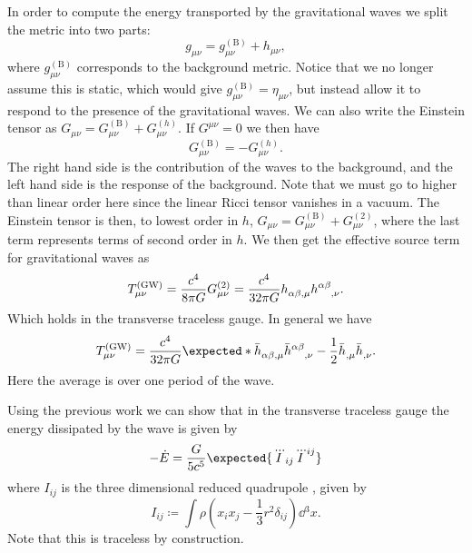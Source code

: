 \documentclass[fleqn]{NotesClass}
\begin{document}
    In order to compute the energy transported by the gravitational waves we split the metric into two parts:
    \begin{equation}
        g_{\mu\nu} = g_{\mu\nu}^{\mathrm{(B)}} + h_{\mu\nu},
    \end{equation}
    where \(g_{\mu\nu}^{\mathrm{(B)}}\) corresponds to the background metric.
    Notice that we no longer assume this is static, which would give \(g_{\mu\nu}^{\mathrm{(B)}} = \eta_{\mu\nu}\), but instead allow it to respond to the presence of the gravitational waves.
    We can also write the Einstein tensor as \(G_{\mu\nu} = G_{\mu\nu}^{\mathrm{(B)}} + G_{\mu\nu}^{(h)}\).
    If \(G^{\mu\nu} = 0\) we then have
    \begin{equation}
        G_{\mu\nu}^{\mathrm{(B)}} = -G_{\mu\nu}^{(h)}.
    \end{equation}
    The right hand side is the contribution of the waves to the background, and the left hand side is the response of the background.
    Note that we must go to higher than linear order here since the linear Ricci tensor vanishes in a vacuum.
    The Einstein tensor is then, to lowest order in \(h\), \(G_{\mu\nu} = G_{\mu\nu}^{\mathrm{(B)}} + G_{\mu\nu}^{(2)}\), where the last term represents terms of second order in \(h\).
    We then get the effective source term for gravitational waves as
    \begin{equation}
        T_{\mu\nu}^{\mathrm{(GW)}} = \frac{c^4}{8\pi G}G_{\mu\nu}^{(2)} = \frac{c^4}{32\pi G}\tensor{h}{_{\alpha\beta,\mu}}\tensor{h}{^{\alpha\beta}_{,\nu}}.
    \end{equation}
    Which holds in the transverse traceless gauge.
    In general we have
    \begin{equation}
        T_{\mu\nu}^{\mathrm{(GW)}} = \frac{c^4}{32\pi G}\expected*{\tensor{\bar{h}}{_{\alpha\beta,\mu}}\tensor{\bar{h}}{^{\alpha\beta}_{,\nu}} - \frac{1}{2}\tensor{\bar{h}}{_{,\mu}} \tensor{\bar{h}}{_{,\nu}}}.
    \end{equation}
    Here the average is over one period of the wave.
    
    Using the previous work we can show that in the transverse traceless gauge the energy dissipated by the wave is given by
    \begin{equation}
        -\dot{E} = \frac{G}{5c^5} \expected{\dddot{I}_{ij}\dddot{I}^{ij}}
    \end{equation}
    where \(I_{ij}\) is the three dimensional reduced quadrupole , given by
    \begin{equation}
        I_{ij} \coloneqq \int \rho\left( x_ix_j - \frac{1}{3}r^2\delta_{ij} \right) \dd{^3x}.
    \end{equation}
    Note that this is traceless by construction.
    
\end{document}

